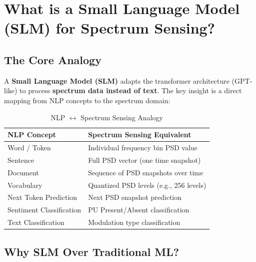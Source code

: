\documentclass[12pt, a4paper]{article}
\begin{document}
\section{What is a Small Language Model (SLM) for Spectrum Sensing?}

\subsection{The Core Analogy}

A \textbf{Small Language Model (SLM)} adapts the transformer architecture (GPT-like) to process \textbf{spectrum data instead of text}. The key insight is a direct mapping from NLP concepts to the spectrum domain:

\begin{table}[H]
\centering
\caption{NLP $\leftrightarrow$ Spectrum Sensing Analogy}
\label{tab:analogy}
\begin{tabular}{@{}ll@{}}
\toprule
\textbf{NLP Concept}          & \textbf{Spectrum Sensing Equivalent} \\
\midrule
Word / Token                   & Individual frequency bin PSD value \\
Sentence                       & Full PSD vector (one time snapshot) \\
Document                       & Sequence of PSD snapshots over time \\
Vocabulary                     & Quantized PSD levels (e.g., 256 levels) \\
Next Token Prediction          & Next PSD snapshot prediction \\
Sentiment Classification       & PU Present/Absent classification \\
Text Classification            & Modulation type classification \\
\bottomrule
\end{tabular}
\end{table}


\subsection{Why SLM Over Traditional ML?}
\end{document}
